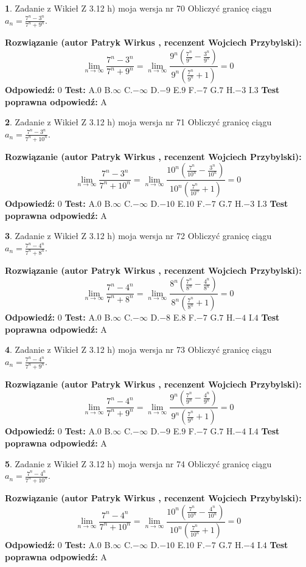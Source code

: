 \documentclass[12pt, a4paper]{article}
\theoremstyle{definition} %
\newtheorem{zad}{}
\newcommand{\zadStart}[1]{\begin{zad}#1\newline}
\newcommand{\zadStop}{\end{zad}}
\newcommand{\rozwStart}[2]{\noindent \textbf{Rozwiązanie (autor #1 , recenzent #2): }\newline}
\newcommand{\rozwStop}{\newline}
\newcommand{\odpStart}{\noindent \textbf{Odpowiedź:}\newline}
\newcommand{\odpStop}{\newline}
\newcommand{\testStart}{\noindent \textbf{Test:}\newline}
\newcommand{\testStop}{\newline}
\newcommand{\kluczStart}{\noindent \textbf{Test poprawna odpowiedź:}\newline}
\newcommand{\kluczStop}{\newline}
\begin{document}
\zadStart{Zadanie z Wikieł Z 3.12 h) moja wersja nr 70}
Obliczyć granicę ciągu $a_{n}=\frac{7^{n} - 3^{n}}{7^{n} + 9^{n}}$.
\zadStop
\rozwStart{Patryk Wirkus}{Wojciech Przybylski}
$$\lim\limits_{n\to\infty}\frac{7^{n} - 3^{n}}{7^{n} + 9^{n}} = \lim\limits_{n\to\infty}\frac{9^{n}(\frac{7^{n}}{9^{n}} - \frac{3^{n}}{9^{n}})}{9^{n}(\frac{7^{n}}{9^{n}} + 1)} = 0$$
\rozwStop
\odpStart
$0$
\odpStop
\testStart
A.$0$
B.$\infty$
C.$-\infty$
D.$-9$
E.$9$
F.$-7$
G.$7$
H.$-3$
I.$3$
\testStop
\kluczStart
A
\kluczStop



\zadStart{Zadanie z Wikieł Z 3.12 h) moja wersja nr 71}
Obliczyć granicę ciągu $a_{n}=\frac{7^{n} - 3^{n}}{7^{n} + 10^{n}}$.
\zadStop
\rozwStart{Patryk Wirkus}{Wojciech Przybylski}
$$\lim\limits_{n\to\infty}\frac{7^{n} - 3^{n}}{7^{n} + 10^{n}} = \lim\limits_{n\to\infty}\frac{10^{n}(\frac{7^{n}}{10^{n}} - \frac{3^{n}}{10^{n}})}{10^{n}(\frac{7^{n}}{10^{n}} + 1)} = 0$$
\rozwStop
\odpStart
$0$
\odpStop
\testStart
A.$0$
B.$\infty$
C.$-\infty$
D.$-10$
E.$10$
F.$-7$
G.$7$
H.$-3$
I.$3$
\testStop
\kluczStart
A
\kluczStop



\zadStart{Zadanie z Wikieł Z 3.12 h) moja wersja nr 72}
Obliczyć granicę ciągu $a_{n}=\frac{7^{n} - 4^{n}}{7^{n} + 8^{n}}$.
\zadStop
\rozwStart{Patryk Wirkus}{Wojciech Przybylski}
$$\lim\limits_{n\to\infty}\frac{7^{n} - 4^{n}}{7^{n} + 8^{n}} = \lim\limits_{n\to\infty}\frac{8^{n}(\frac{7^{n}}{8^{n}} - \frac{4^{n}}{8^{n}})}{8^{n}(\frac{7^{n}}{8^{n}} + 1)} = 0$$
\rozwStop
\odpStart
$0$
\odpStop
\testStart
A.$0$
B.$\infty$
C.$-\infty$
D.$-8$
E.$8$
F.$-7$
G.$7$
H.$-4$
I.$4$
\testStop
\kluczStart
A
\kluczStop



\zadStart{Zadanie z Wikieł Z 3.12 h) moja wersja nr 73}
Obliczyć granicę ciągu $a_{n}=\frac{7^{n} - 4^{n}}{7^{n} + 9^{n}}$.
\zadStop
\rozwStart{Patryk Wirkus}{Wojciech Przybylski}
$$\lim\limits_{n\to\infty}\frac{7^{n} - 4^{n}}{7^{n} + 9^{n}} = \lim\limits_{n\to\infty}\frac{9^{n}(\frac{7^{n}}{9^{n}} - \frac{4^{n}}{9^{n}})}{9^{n}(\frac{7^{n}}{9^{n}} + 1)} = 0$$
\rozwStop
\odpStart
$0$
\odpStop
\testStart
A.$0$
B.$\infty$
C.$-\infty$
D.$-9$
E.$9$
F.$-7$
G.$7$
H.$-4$
I.$4$
\testStop
\kluczStart
A
\kluczStop



\zadStart{Zadanie z Wikieł Z 3.12 h) moja wersja nr 74}
Obliczyć granicę ciągu $a_{n}=\frac{7^{n} - 4^{n}}{7^{n} + 10^{n}}$.
\zadStop
\rozwStart{Patryk Wirkus}{Wojciech Przybylski}
$$\lim\limits_{n\to\infty}\frac{7^{n} - 4^{n}}{7^{n} + 10^{n}} = \lim\limits_{n\to\infty}\frac{10^{n}(\frac{7^{n}}{10^{n}} - \frac{4^{n}}{10^{n}})}{10^{n}(\frac{7^{n}}{10^{n}} + 1)} = 0$$
\rozwStop
\odpStart
$0$
\odpStop
\testStart
A.$0$
B.$\infty$
C.$-\infty$
D.$-10$
E.$10$
F.$-7$
G.$7$
H.$-4$
I.$4$
\testStop
\kluczStart
A
\kluczStop
\end{document}
